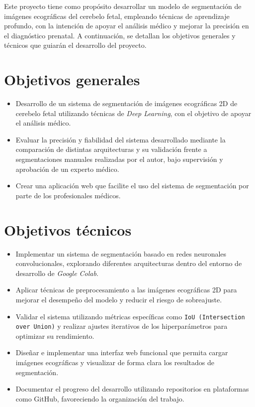 
Este proyecto tiene como propósito desarrollar un modelo de segmentación de imágenes ecográficas del cerebelo fetal, empleando técnicas de aprendizaje profundo, con la intención de apoyar el análisis médico y mejorar la precisión en el diagnóstico prenatal. A continuación, se detallan los objetivos generales y técnicos que guiarán el desarrollo del proyecto.

\section{Objetivos generales}
\begin{itemize}
    \item Desarrollo de un sistema de segmentación de imágenes ecográficas 2D de cerebelo fetal utilizando técnicas de \textit{Deep Learning}, con el objetivo de apoyar el análisis médico.
    \item Evaluar la precisión y fiabilidad del sistema desarrollado mediante la comparación de distintas arquitecturas y su validación frente a segmentaciones manuales realizadas por el autor, bajo supervisión y aprobación de un experto médico.
    \item Crear una aplicación web que facilite el uso del sistema de segmentación por parte de los profesionales médicos.
\end{itemize}
\section{Objetivos técnicos}
\begin{itemize}
    \item Implementar un sistema de segmentación basado en redes neuronales convolucionales, explorando diferentes arquitecturas dentro del entorno de desarrollo de \textit{Google Colab}.
    \item Aplicar técnicas de preprocesamiento a las imágenes ecográficas 2D para mejorar el desempeño del modelo y reducir el riesgo de sobreajuste.
    \item Validar el sistema utilizando métricas específicas como \texttt{IoU (Intersection over Union)} y realizar ajustes iterativos de los hiperparámetros para optimizar su rendimiento.
    \item Diseñar e implementar una interfaz web funcional que permita cargar imágenes ecográficas y visualizar de forma clara los resultados de segmentación.
    \item Documentar el progreso del desarrollo utilizando repositorios en plataformas como GitHub, favoreciendo la organización del trabajo.
\end{itemize}
